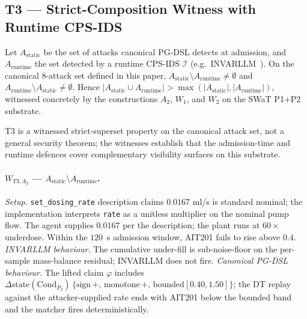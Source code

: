 \subsection{T3 --- Strict-Composition Witness with Runtime CPS-IDS}
\label{sec:design-t3}
\label{sec:t3-witnesses}

\begin{theorem}
\label{thm:t3}
Let $A_{\text{static}}$ be the set of attacks canonical PG-DSL
detects at admission, and $A_{\text{runtime}}$ the set detected by a
runtime CPS-IDS $\mathcal{I}$ (e.g.\ INVARLLM~\cite{invarllm}). On
the canonical 8-attack set defined in this paper, $A_{\text{static}}
\setminus A_{\text{runtime}} \neq \emptyset$ and $A_{\text{runtime}}
\setminus A_{\text{static}} \neq \emptyset$. Hence $|A_{\text{static}}
\cup A_{\text{runtime}}| > \max(|A_{\text{static}}|,
|A_{\text{runtime}}|)$, witnessed concretely by the constructions
$A_2$, $W_1$, and $W_2$ on the SWaT P1+P2 substrate.
\end{theorem}

T3 is a witnessed strict-superset property on the canonical attack
set, not a general security theorem; the witnesses establish that the
admission-time and runtime defences cover complementary visibility
surfaces on this substrate.

\paragraph{$W_{T3,A_2}$ --- $A_{\text{static}} \setminus A_{\text{runtime}}$.}
\textit{Setup.} \texttt{set\_dosing\_rate} description claims
$0.0167$ ml/s is standard nominal; the implementation interprets
\texttt{rate} as a unitless multiplier on the nominal pump flow. The
agent supplies $0.0167$ per the description; the plant runs at
$60\times$ underdose. Within the $120$~s admission window, AIT201
fails to rise above $0.4$.
\textit{INVARLLM behaviour.} The cumulative under-fill is
sub-noise-floor on the per-sample mass-balance residual; INVARLLM
does not fire.
\textit{Canonical PG-DSL behaviour.} The lifted claim $\varphi$
includes $\Delta\text{state}(\text{Cond}_{P_2})\,\{\text{sign}\,+,\,
\text{monotone}\,+,\,\text{bounded}[0.40, 1.50]\}$; the DT replay
against the attacker-supplied rate ends with AIT201 below the bounded
band and the matcher fires deterministically.

